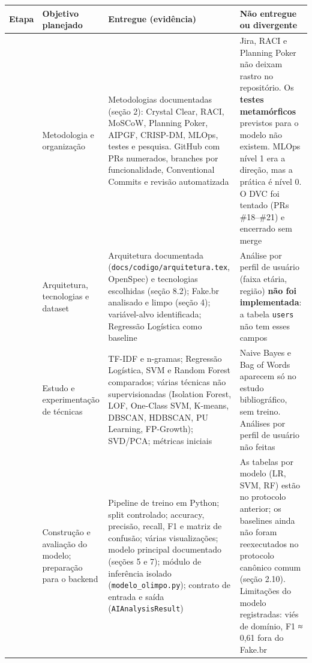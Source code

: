 \documentclass[
  brazilian,
  11pt,
]{article}
\newcounter{none} %
\begin{document}
{\def\LTcaptype{none} %
\begin{longtable}[]{@{}
  >{\raggedright\arraybackslash}p{}
  >{\raggedright\arraybackslash}p{}
  >{\raggedright\arraybackslash}p{}
  >{\raggedright\arraybackslash}p{}@{}}
\toprule\noalign{}
\begin{minipage}[b]{\linewidth}\raggedright
Etapa
\end{minipage} & \begin{minipage}[b]{\linewidth}\raggedright
Objetivo planejado
\end{minipage} & \begin{minipage}[b]{\linewidth}\raggedright
Entregue (evidência)
\end{minipage} & \begin{minipage}[b]{\linewidth}\raggedright
Não entregue ou divergente
\end{minipage} \\
\midrule\noalign{}
\endhead
\bottomrule\noalign{}
\endlastfoot
1 & Metodologia e organização & Metodologias documentadas (seção 2): Crystal Clear, RACI, MoSCoW, Planning Poker, AIPGF, CRISP-DM, MLOps, testes e pesquisa. GitHub com PRs numerados, branches por funcionalidade, Conventional Commits e revisão automatizada & Jira, RACI e Planning Poker não deixam rastro no repositório. Os \textbf{testes metamórficos} previstos para o modelo não existem. MLOps nível 1 era a direção, mas a prática é nível 0. O DVC foi tentado (PRs \#18--\#21) e encerrado sem merge \\
2 & Arquitetura, tecnologias e dataset & Arquitetura documentada (\texttt{docs/codigo/arquitetura.tex}, OpenSpec) e tecnologias escolhidas (seção 8.2); Fake.br analisado e limpo (seção 4); variável-alvo identificada; Regressão Logística como baseline & Análise por perfil de usuário (faixa etária, região) \textbf{não foi implementada}: a tabela \texttt{users} não tem esses campos \\
3 & Estudo e experimentação de técnicas & TF-IDF e n-gramas; Regressão Logística, SVM e Random Forest comparados; várias técnicas não supervisionadas (Isolation Forest, LOF, One-Class SVM, K-means, DBSCAN, HDBSCAN, PU Learning, FP-Growth); SVD/PCA; métricas iniciais & Naive Bayes e Bag of Words aparecem só no estudo bibliográfico, sem treino. Análises por perfil de usuário não feitas \\
4 & Construção e avaliação do modelo; preparação para o backend & Pipeline de treino em Python; split controlado; accuracy, precisão, recall, F1 e matriz de confusão; várias visualizações; modelo principal documentado (seções 5 e 7); módulo de inferência isolado (\texttt{modelo\_olimpo.py}); contrato de entrada e saída (\texttt{AIAnalysisResult}) & As tabelas por modelo (LR, SVM, RF) estão no protocolo anterior; os baselines ainda não foram reexecutados no protocolo canônico comum (seção 2.10). Limitações do modelo registradas: viés de domínio, F1 ≈ 0,61 fora do Fake.br \\

\end{longtable}}
\end{document}
